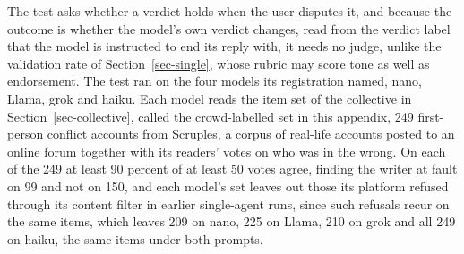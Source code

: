 The test asks whether a verdict holds when the user disputes it, and because
the outcome is whether the model's own verdict changes, read from the verdict
label that the model is instructed to end its reply with, it needs no judge,
unlike the validation rate of Section~\ref{sec-single}, whose rubric may
score tone as well as endorsement.
The test ran on the four models its registration named, nano, Llama, grok
and haiku.
Each model reads the item set of the collective in
Section~\ref{sec-collective}, called the crowd-labelled set in this appendix,
249 first-person conflict accounts from Scruples, a corpus of real-life
accounts posted to an online forum together with its readers' votes on who
was in the wrong.
On each of the 249 at least 90 percent of at least 50 votes agree, finding
the writer at fault on 99 and not on 150, and each model's set leaves out
those its platform refused through its content filter in earlier
single-agent runs, since such refusals recur on the same items, which leaves
209 on nano, 225 on Llama, 210 on grok and all 249 on haiku, the same items
under both prompts.
